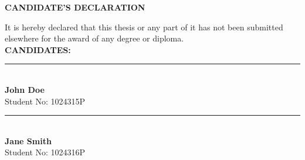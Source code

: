 \begin{titlepage}
\begin{center}
    \vspace*{1.0cm}
    {\large \bfseries CANDIDATE'S DECLARATION}\\[1.5cm]
\end{center}

\noindent It is hereby declared that this thesis or any part of it has not been submitted elsewhere for the award of any degree or diploma.\\[3.0cm]

\noindent \textbf{CANDIDATES:}\\[2.0cm]

\noindent\begin{minipage}[t]{0.45\textwidth}
    \rule{6cm}{0.5pt}\\
    \textbf{John Doe}\\
    Student No: 1024315P
\end{minipage}
\hfill
\begin{minipage}[t]{0.45\textwidth}
    \rule{6cm}{0.5pt}\\
    \textbf{Jane Smith}\\
    Student No: 1024316P
\end{minipage}

\end{titlepage}
